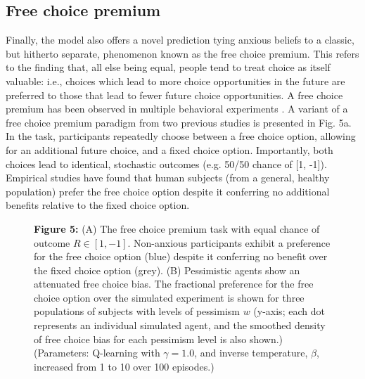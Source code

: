 \documentclass[11pt]{article} %
\begin{document}
\subsection{Free choice premium}

Finally, the model also offers a novel prediction tying anxious beliefs to a classic, but hitherto separate, phenomenon known as the free choice premium. This refers to the finding that, all else being equal, people tend to treat choice as itself valuable: i.e., choices which lead to more choice opportunities in the future are preferred to those that lead to fewer future choice opportunities. A free choice premium has been observed in multiple behavioral experiments \cite{Leotti2010, ly2019}. A variant of a free choice premium paradigm from two previous studies\cite{Leotti2011,Leotti2014} is presented in Fig. 5a. In the task, participants repeatedly choose between a free choice option, allowing for an additional future choice, and a fixed choice option. Importantly, both choices lead to identical, stochastic outcomes (e.g. 50/50 chance of [1, -1]). Empirical studies have found that human subjects (from a general, healthy population) prefer the free choice option despite it conferring no additional benefits relative to the fixed choice option. 

\begin{figure}[t]
  \centerline{%
  }
  \par \textbf{Figure 5:} (A) The free choice premium task\cite{Leotti2011,Leotti2014} with equal chance of outcome $R \in [1, -1]$. Non-anxious participants exhibit a preference for the free choice option (blue) despite it conferring no benefit over the fixed choice option (grey). (B) Pessimistic agents show an attenuated free choice bias. The fractional preference for the free choice option over the simulated experiment is shown for three populations of subjects with levels of pessimism $w$ (y-axis; each dot represents an individual simulated agent, and the smoothed density of free choice bias for each pessimism level is also shown.)
  (Parameters: Q-learning with $\gamma = 1.0$, and inverse temperature, $\beta$, increased from 1 to 10 over 100 episodes.)
\end{figure}
\end{document}
